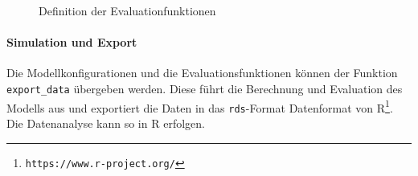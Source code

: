 \begin{figure}[!h]
	
		\caption{Definition der Evaluationfunktionen}
	\label{lst:eval_param}
\end{figure}


\captionsetup[figure]{name=Abbildung}

\paragraph{Simulation und Export}
Die Modellkonfigurationen und die Evaluationsfunktionen können der Funktion \texttt{export\_data} übergeben werden. Diese führt die Berechnung und Evaluation des Modells aus und exportiert die Daten in das \texttt{rds}-Format Datenformat von R\footnote{\texttt{https://www.r-project.org/}}. Die Datenanalyse kann so in R erfolgen.



